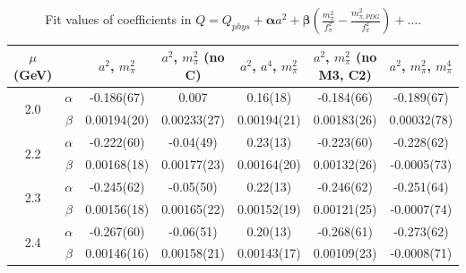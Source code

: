 \documentclass[12pt]{extarticle}
\begin{document}
\begin{table}[h!]
\begin{center}
\begin{tabular}{|c c|c|c|c|c|c|}
\hline
$\mu$ (GeV) &  & $a^2$, $m_\pi^2$& $a^2$, $m_\pi^2$ (no C)& $a^2$, $a^4$, $m_\pi^2$& $a^2$, $m_\pi^2$ (no M3, C2)& $a^2$, $m_\pi^2$, $m_\pi^4$\\
\hline
\multirow{2}{0.5in}{2.0} & $\alpha$ & -0.186(67)& 0.007& 0.16(18)& -0.184(66)& -0.189(67)\\
 & $\beta$ & 0.00194(20)& 0.00233(27)& 0.00194(21)& 0.00183(26)& 0.00032(78)\\
\hline
\multirow{2}{0.5in}{2.2} & $\alpha$ & -0.222(60)& -0.04(49)& 0.23(13)& -0.223(60)& -0.228(62)\\
 & $\beta$ & 0.00168(18)& 0.00177(23)& 0.00164(20)& 0.00132(26)& -0.0005(73)\\
\hline
\multirow{2}{0.5in}{2.3} & $\alpha$ & -0.245(62)& -0.05(50)& 0.22(13)& -0.246(62)& -0.251(64)\\
 & $\beta$ & 0.00156(18)& 0.00165(22)& 0.00152(19)& 0.00121(25)& -0.0007(74)\\
\hline
\multirow{2}{0.5in}{2.4} & $\alpha$ & -0.267(60)& -0.06(51)& 0.20(13)& -0.268(61)& -0.273(62)\\
 & $\beta$ & 0.00146(16)& 0.00158(21)& 0.00143(17)& 0.00109(23)& -0.0008(71)\\
\hline
\end{tabular}
\caption{Fit values of coefficients in $Q = Q_{phys} + \mathbf{\alpha} a^2 + \mathbf{\beta}\left(\frac{m_\pi^2}{f_\pi^2}-\frac{m_{\pi,PDG}^2}{f_\pi^2}\right) + \ldots$.}
\end{center}
\end{table}




















\clearpage
\end{document}
